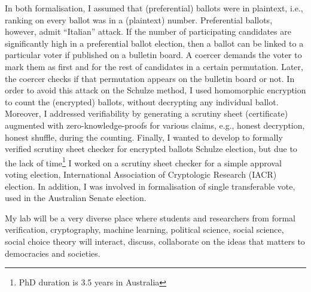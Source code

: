 \documentclass[a4paper]{article}
\begin{document}
In both formalisation, I assumed that (preferential) ballots were in plaintext, i.e., 
ranking on every ballot was in a (plaintext) number.  Preferential ballots, 
however, admit ``Italian'' attack. 
If the number of participating candidates are significantly high in 
a preferential ballot election,
then a ballot can be linked to a particular voter if published on a bulletin board.
A coercer demands the voter to mark them as first and for the rest of candidates
in a certain permutation. Later, the coercer checks if that permutation appears 
on the bulletin board or not. In order to
avoid this attack on the Schulze method, I used homomorphic encryption to count the (encrypted) ballots, without decrypting 
any individual ballot. Moreover, I addressed verifiability by generating a scrutiny sheet (certificate) 
augmented with zero-knowledge-proofs for various claims, e.g., honest decryption, honest shuffle,  
during the counting. 
Finally, I wanted to develop to formally 
verified scrutiny sheet checker for encrypted ballots Schulze election, but due to the lack of 
time\footnote{PhD duration is 3.5 years in Australia} I worked on a scrutiny sheet checker for a simple approval voting election,
International Association of Cryptologic Research (IACR) election.
In addition, I was involved in formalisation of single transferable vote, used in the Australian Senate election.





My lab will be a very diverse place where students and researchers from formal 
verification, cryptography, machine learning,
political science, social science, social choice theory will interact, discuss, 
collaborate on the ideas that matters to democracies and societies. 
\end{document}
